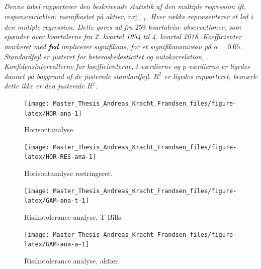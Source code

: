 \documentclass[
  a4paper,
  oneside]{memoir}
\begin{document}
\begin{table}[H]
{\begin{threeparttable}
\begin{tabular}[t]{llrrrrrrrr}
\bottomrule
\end{tabular}
\begin{tablenotes}
\item \textit{Denne tabel rapporterer den beskrivende statistik af den multiple regression ift. responsvariablen: merafkastet på aktier, $rx_{t+1}^{\text{a}}$. Hver række repræsenterer et led i den mutiple regression. Dette gøres ud fra $259$ kvartalvise observationer, som spænder over kvartalerne fra 2. kvartal 1954 til 4. kvartal 2018. Koefficienter markeret med \textbf{fed} implicerer signifikans, for et signifikansniveau på $\alpha=0.05$. Standardfejl er justeret for heteroskedasticitet og autokorrelation, \citep{Newey1987}. Konfidensintervallerne for koefficienterne, $t$-værdierne og $p$-værdierne er ligedes dannet på baggrund af de justerede standardfejl. $R^2$ er ligedes rapporteret, bemærk dette ikke er den justerede $R^2$.}
\end{tablenotes}
\end{threeparttable}}
\end{table}

\begin{figure}[H]

{\centering \texttt{[image: Master\_Thesis\_Andreas\_Kracht\_Frandsen\_files/figure-latex/HOR-ana-1]} 

}

\caption{Horisontanalyse.}\label{fig:HOR-ana}
\end{figure}

\begin{figure}[H]

{\centering \texttt{[image: Master\_Thesis\_Andreas\_Kracht\_Frandsen\_files/figure-latex/HOR-RES-ana-1]} 

}

\caption{Horisontanalyse restringeret.}\label{fig:HOR-RES-ana}
\end{figure}

\begin{figure}[H]

{\centering \texttt{[image: Master\_Thesis\_Andreas\_Kracht\_Frandsen\_files/figure-latex/GAM-ana-t-1]} 

}

\caption{Risikotolerance analyse, T-Bills.}\label{fig:GAM-ana-t}
\end{figure}

\begin{figure}[H]

{\centering \texttt{[image: Master\_Thesis\_Andreas\_Kracht\_Frandsen\_files/figure-latex/GAM-ana-a-1]} 

}

\caption{Risikotolerance analyse, aktier.}\label{fig:GAM-ana-a}
\end{figure}
\end{document}
